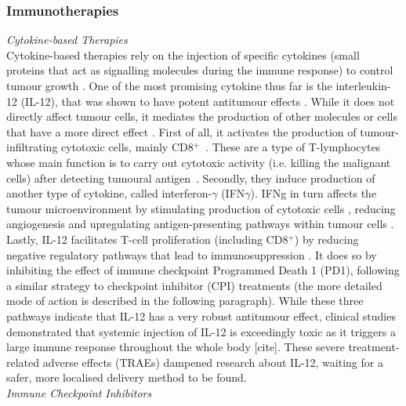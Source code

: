 \documentclass[11pt]{article}
\begin{document}
\subsubsection{Immunotherapies}
\textit{Cytokine-based Therapies}\\[5pt]
Cytokine-based therapies rely on the injection of specific cytokines (small proteins that act as signalling molecules during the immune response) to control tumour growth \cite{ioDef}. One of the most promising cytokine thus far is the interleukin-12 (IL-12), that was shown to have potent antitumour effects \cite{il12IsCool}. While it does not directly affect tumour cells, it mediates the production of other molecules or cells that have a more direct effect \cite{il12CytokineStorm}. First of all, it activates the production of tumour-infiltrating cytotoxic cells, mainly CD8$^+$~\cite{cd8FirstWay}. These are a type of T-lymphocytes whose main function is to carry out cytotoxic activity (i.e. killing the malignant cells) after detecting tumoural antigen~\cite{cd8Effects}. Secondly, they induce production of another type of cytokine, called interferon-$\gamma$ (IFN$\gamma$). IFNg in turn affects the tumour microenvironment by stimulating production of cytotoxic cells \cite{ifngNKProd}, reducing angiogenesis \cite{ifngAngiogenesis} and upregulating antigen-presenting pathways within tumour cells \cite{ifngAntigenExposure}. Lastly, IL-12 facilitates T-cell proliferation (including CD8$^+$) by reducing negative regulatory pathways that lead to immunosuppression \cite{reducImmunoSuppression}. It does so by inhibiting the effect of immune checkpoint Programmed Death 1 (PD1), following a similar strategy to checkpoint inhibitor (CPI) treatments (the more detailed mode of action is described in the following paragraph). While these three pathways indicate that IL-12 has a very robust antitumour effect, clinical studies demonstrated that systemic injection of IL-12 is exceedingly toxic as it triggers a large immune response throughout the whole body [cite]. These severe treatment-related adverse effects (TRAEs) dampened research about IL-12, waiting for a safer, more localised delivery method to be found.\\[12pt]
%
\noindent\textit{Immune Checkpoint Inhibitors}\\[5pt]
\end{document}

